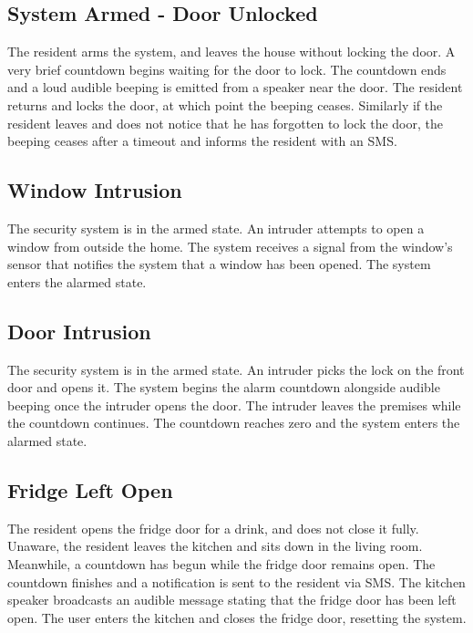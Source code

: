 \documentclass{report}
\begin{document}
\subsection*{System Armed - Door Unlocked}

The resident arms the system, and leaves the house without locking the door.
A very brief countdown begins waiting for the door to lock. The countdown
ends and a loud audible beeping is emitted from a speaker near the door. The
resident returns and locks the door, at which point the beeping ceases.
Similarly if the resident leaves and does not notice that he has forgotten to
lock the door, the beeping ceases after a timeout and informs the resident with
an SMS.

\subsection*{Window Intrusion}

The security system is in the armed state. An intruder attempts to open a
window from outside the home. The system receives a signal from the window's
sensor that notifies the system that a window has been opened. The system
enters the alarmed state.

\subsection*{Door Intrusion}

The security system is in the armed state. An intruder picks the lock on the
front door and opens it.  The system begins the alarm countdown alongside
audible beeping once the intruder opens the door.  The intruder leaves the
premises while the countdown continues. The countdown reaches zero and the
system enters the alarmed state.

\subsection*{Fridge Left Open}

The resident opens the fridge door for a drink, and does not close it fully.
Unaware, the resident leaves the kitchen and sits down in the living room.
Meanwhile, a countdown has begun while the fridge door remains open. The
countdown finishes and a notification is sent to the resident via SMS. The
kitchen speaker broadcasts an audible message stating that the fridge door has
been left open. The user enters the kitchen and closes the fridge door,
resetting the system. 
\end{document}
